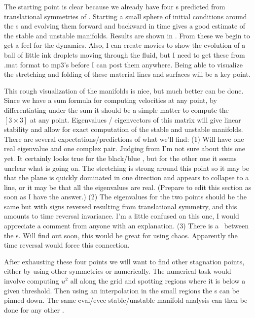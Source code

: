 The starting point is clear because we already have four \stagp s
predicted from translational symmetries of \pCf. Starting a small
sphere of initial conditions around the \stagp s and evolving them
forward and backward in time gives a good estimate of the stable and
unstable manifolds. Results are shown in
. From these we begin to get a feel for
the dynamics. Also, I can create movies to show the evolution of a
ball of little ink droplets moving through the fluid, but I need to
get these from .mat format to mp3's before I can post them anywhere.
Being able to visualize the stretching and folding of these material
lines and surfaces will be a key point.

This rough visualization of the manifolds is nice, but much better
can be done. Since we have a sum formula for computing velocities at
any point, by differentiating under the sum it should be a simple
matter to compute the $[3\!\times\! 3]$ {\velgradmat}
at any point. Eigenvalues / eigenvectors of this matrix will
give linear stability and allow for exact computation of the stable
and unstable manifolds. There are several expectations/predictions
of what we'll find: (1) Will have one real eigenvalue and one
complex pair. Judging from  I'm
not sure about this one yet. It certainly looks true for the
black/blue \stagp, but for the other one it seems unclear what is
going on. The stretching is strong around this point so it may be
that the plane is quickly dominated in one direction and appears to
collapse to a line, or it may be that all the eigenvalues are real.
(Prepare to edit this section as soon as I have the answer.) (2) The
eigenvalues for the two points should be the same but with signs
reversed resulting from translational symmetry, and this amounts to
time reversal invariance. I'm a little confused on this one, I would
appreciate a comment from anyone with an explanation. (3) There is a
\hec\ between the \stagp s. Will find out soon,
this would be great for using chaos. Apparently the time reversal
would force this connection.

After exhausting these four points we will want to find other
stagnation points, either by using other symmetries or numerically.
The numerical task would involve computing $u^{2}$ all along the
grid and spotting regions where it is below a given threshold. Then
using an interpolation in the small regions the \stagp s can be
pinned down. The same eval/evec stable/unstable manifold analysis
can then be done for any other \stagp.

